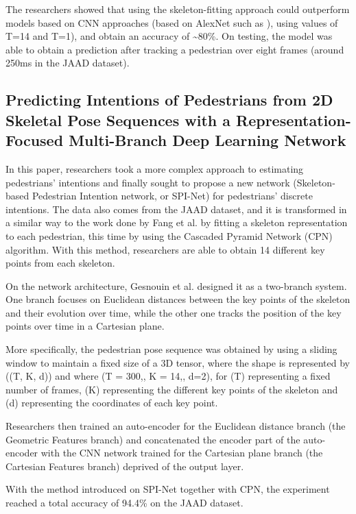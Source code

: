 \documentclass[journal,letterpaper]{IEEEtran}
\begin{document}
The researchers showed that using the skeleton-fitting approach could outperform models based on CNN approaches (based on AlexNet such as \cite{rasouli2017ICCVW}), using values of T=14 and T=1), and obtain an accuracy of \textasciitilde80\%. On testing, the model was able to obtain a prediction after tracking a pedestrian over eight frames (around 250ms in the JAAD dataset).


\subsection{Predicting Intentions of Pedestrians from 2D Skeletal Pose Sequences with a Representation-Focused Multi-Branch Deep Learning Network}\label{predicting-intentions-of-pedestrians-from-2d-skeletal-pose-sequences-with-a-representation-focused-multi-branch-deep-learning-network}

In this paper, researchers took a more complex approach to estimating pedestrians' intentions and finally sought to propose a new network (Skeleton-based Pedestrian Intention network, or SPI-Net) for pedestrians' discrete intentions. The data also comes from the JAAD dataset, and it is transformed in a similar way to the work done by Fang et al. by fitting a skeleton representation to each pedestrian, this time by using the Cascaded Pyramid Network (CPN) algorithm. With this method, researchers are able to obtain 14 different key points from each skeleton.

On the network architecture, Gesnouin et al. designed it as a two-branch system. One branch focuses on Euclidean distances between the key points of the skeleton and their evolution over time, while the other one tracks the position of the key points over time in a Cartesian plane.

More specifically, the pedestrian pose sequence was obtained by using a sliding window to maintain a fixed size of a 3D tensor, where the shape is represented by ((T, K, d)) and where (T = 300,, K = 14,, d=2), for (T) representing a fixed number of frames, (K) representing the different key points of the skeleton and (d) representing the coordinates of each key point.

Researchers then trained an auto-encoder for the Euclidean distance branch (the Geometric Features branch) and concatenated the encoder part of the auto-encoder with the CNN network trained for the Cartesian plane branch (the Cartesian Features branch) deprived of the output layer.

With the method introduced on SPI-Net together with CPN, the experiment reached a total accuracy of 94.4\% on the JAAD dataset.
\end{document}
